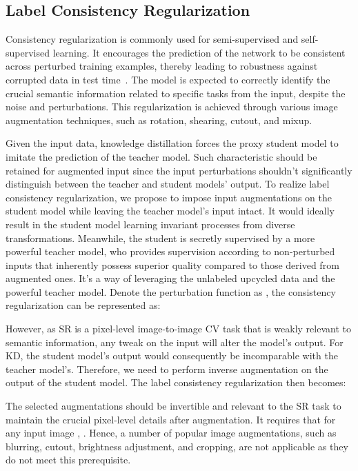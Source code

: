 \documentclass[10pt,twocolumn,letterpaper]{article}
\newcommand{\red}[1]{{\color{black}#1}}
\begin{document}
\red{
\subsection{Label Consistency Regularization}

Consistency regularization is commonly used for semi-supervised and self-supervised learning. It encourages the prediction of the network to be consistent across perturbed training examples, thereby leading to robustness against corrupted data in test time~\cite{oliver2018realistic, englesson2021consistency,jeong2019consistency}. The model is expected to correctly identify the crucial semantic information related to specific tasks from the input, despite the noise and perturbations. This regularization is achieved through various image augmentation techniques, such as rotation, shearing, cutout, and mixup.

Given the input data, knowledge distillation forces the proxy student model to imitate the prediction of the teacher model. Such characteristic should be retained for augmented input since the input perturbations shouldn't significantly distinguish between the teacher and student models' output. To realize label consistency regularization, we propose to impose input augmentations on the student model while leaving the teacher model's input intact. It would ideally result in the student model learning invariant processes from diverse transformations. Meanwhile, the student is secretly supervised by a more powerful teacher model, who provides supervision according to non-perturbed inputs that inherently possess superior quality compared to those derived from augmented ones. It's a way of leveraging the unlabeled upcycled data and the powerful teacher model. Denote the perturbation function as , the consistency regularization can be represented as:
\vspace{-0.25em}

However, as SR is a pixel-level image-to-image CV task that is weakly relevant to semantic information, any tweak on the input will alter the model's output. For KD, the student model's output would consequently be incomparable with the teacher model's. Therefore, we need to perform inverse augmentation  on the output of the student model. The label consistency regularization then becomes:
\vspace{-0.25em}
}
The selected augmentations should be invertible and relevant to the SR task to maintain the crucial pixel-level details after augmentation. It requires that for any input image , .
Hence, a number of popular image augmentations, such as blurring, cutout, brightness adjustment, and cropping, are not applicable as they do not meet this prerequisite.
\end{document}
